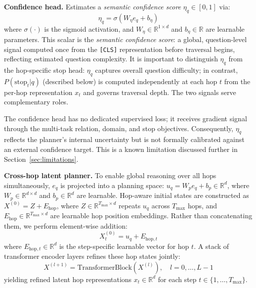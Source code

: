 \documentclass[10pt,conference]{IEEEtran}
\begin{document}
\textbf{Confidence head.} Estimates a \emph{semantic confidence score} $\eta_q \in [0, 1]$ via:
\begin{equation}
\eta_q = \sigma(W_\eta e_q + b_\eta)
\end{equation}
where $\sigma(\cdot)$ is the sigmoid activation, and $W_\eta \in \mathbb{R}^{1 \times d}$ and $b_\eta \in \mathbb{R}$ are learnable parameters. This scalar is the \emph{semantic confidence score}: a global, question-level signal computed once from the \texttt{[CLS]} representation before traversal begins, reflecting estimated question complexity. It is important to distinguish $\eta_q$ from the hop-specific stop head: $\eta_q$ captures overall question difficulty; in contrast, $P(\text{stop}_t|q)$ (described below) is computed independently at each hop $t$ from the per-hop representation $x_t$ and governs traversal depth. The two signals serve complementary roles.

The confidence head has no dedicated supervised loss; it receives gradient signal through the multi-task relation, domain, and stop objectives. Consequently, $\eta_q$ reflects the planner's internal uncertainty but is not formally calibrated against an external confidence target. This is a known limitation discussed further in Section~\ref{sec:limitations}.

\textbf{Cross-hop latent planner.} To enable global reasoning over all hops simultaneously, $e_q$ is projected into a planning space: $u_q = W_p e_q + b_p \in \mathbb{R}^{d}$, where $W_p \in \mathbb{R}^{d \times d}$ and $b_p \in \mathbb{R}^{d}$ are learnable. Hop-aware initial states are constructed as $X^{(0)} = Z + E_{\text{hop}}$, where $Z \in \mathbb{R}^{T_{\text{max}} \times d}$ repeats $u_q$ across $T_{\text{max}}$ hops, and $E_{\text{hop}} \in \mathbb{R}^{T_{\text{max}} \times d}$ are learnable hop position embeddings. Rather than concatenating them, we perform element-wise addition:
\begin{equation}
X^{(0)}_t = u_q + E_{\text{hop}, t}
\end{equation}
where $E_{\text{hop}, t} \in \mathbb{R}^{d}$ is the step-specific learnable vector for hop $t$. A stack of transformer encoder layers refines these hop states jointly:
\begin{equation}
X^{(l+1)} = \text{TransformerBlock}(X^{(l)}), \quad l = 0,\dots,L-1
\end{equation}
yielding refined latent hop representations $x_t \in \mathbb{R}^{d}$ for each step $t \in \{1,\dots,T_{\text{max}}\}$.
\end{document}
